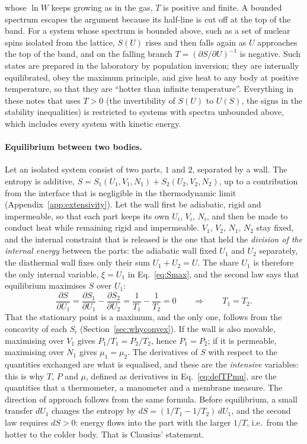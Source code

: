 \documentclass[10pt,a4paper]{article}
\theoremstyle{remark}
\begin{document}
whose $\ln W$ keeps growing as in the gas, $T$ is positive and finite. A
bounded spectrum escapes the argument because its half-line is cut off at the
top of the band.
For a system whose spectrum is bounded above, such as a set of nuclear spins
isolated from the lattice, $S(U)$ rises and then falls again as $U$ approaches
the top of the band, and on the falling branch $T=(\partial S/\partial U)^{-1}$
is negative. Such states are prepared in the laboratory by population
inversion; they are internally equilibrated, obey the maximum principle, and
give heat to any body at positive temperature, so that they are ``hotter than
infinite temperature''. Everything in these notes that uses $T>0$ (the
invertibility of $S(U)$ to $U(S)$, the signs in the stability inequalities)
is restricted to systems with spectra unbounded above, which includes every
system with kinetic energy.

\paragraph{Equilibrium between two bodies.} Let an isolated system consist of
two parts, $1$ and $2$, separated by a wall. The entropy is additive,
$S=S_1(U_1,V_1,N_1)+S_2(U_2,V_2,N_2)$, up to a contribution from the interface
that is negligible in the thermodynamic limit (Appendix~\ref{app:extensivity}).
Let the wall first be adiabatic, rigid and impermeable, so that each part
keeps its own $U_i$, $V_i$, $N_i$, and then be made to conduct heat while
remaining rigid and impermeable. $V_1$, $V_2$, $N_1$, $N_2$ stay fixed, and the
internal constraint that is released is the one that held the \emph{division
of the internal energy} between the parts: the adiabatic wall fixed $U_1$ and
$U_2$ separately, the diathermal wall fixes only their sum $U_1+U_2=U$. The
share $U_1$ is therefore the only internal variable, $\xi=U_1$ in
Eq.~\eqref{eq:Smax}, and the second law says that equilibrium maximises $S$
over $U_1$:
\[
  \frac{\partial S}{\partial U_1}
  =\frac{\partial S_1}{\partial U_1}-\frac{\partial S_2}{\partial U_2}
  =\frac{1}{T_1}-\frac{1}{T_2}=0
  \qquad\Longrightarrow\qquad T_1=T_2 .
\]
That the stationary point is a
maximum, and the only one, follows from the concavity of each $S_i$
(Section~\ref{sec:whyconvex}).
If the wall is also movable, maximising over $V_1$ gives $P_1/T_1=P_2/T_2$,
hence $P_1=P_2$; if it is permeable, maximising over $N_1$ gives $\mu_1=\mu_2$.
The derivatives of $S$ with respect to the quantities exchanged are what is
equalised, and these are the \emph{intensive} variables: this is why $T$, $P$ and
$\mu$, defined as derivatives in Eq.~\eqref{eq:defTPmu}, are the quantities
that a thermometer, a manometer and a membrane measure. The direction of
approach follows from the same formula. Before equilibrium, a small transfer
$dU_1$ changes the entropy by $dS=(1/T_1-1/T_2)\,dU_1$, and the second law
requires $dS>0$: energy flows into the part with the larger $1/T$, i.e.\ from
the hotter to the colder body. That is Clausius' statement.
\end{document}

